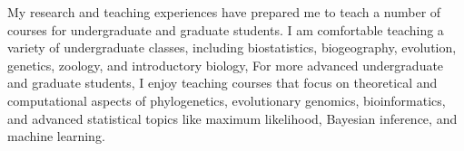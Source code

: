 My research and teaching experiences have prepared me to teach a number of
courses for undergraduate and graduate students.
I am comfortable teaching a variety of undergraduate classes, including
biostatistics,
biogeography,
evolution,
genetics,
zoology,
and
introductory biology,
For more advanced undergraduate and graduate students, I enjoy teaching courses
that focus on theoretical and computational aspects of
phylogenetics,
evolutionary genomics,
bioinformatics,
and
advanced statistical topics like
maximum likelihood,
Bayesian inference,
and
machine learning.

